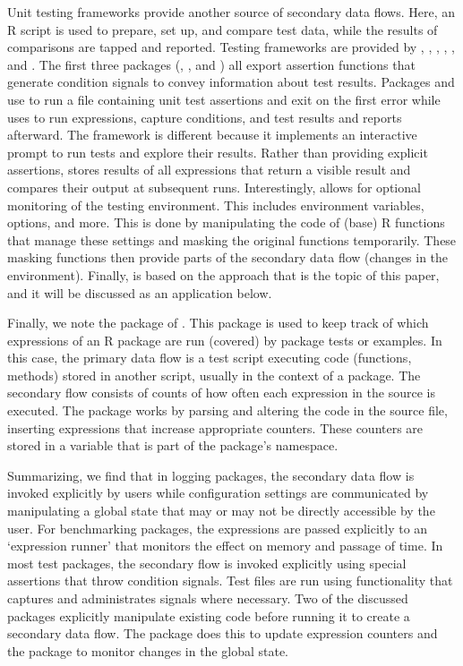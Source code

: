 Unit testing frameworks provide another source of secondary data flows.  Here,
an R script is used to prepare, set up, and compare test data, while the
results of comparisons are tapped and reported. Testing frameworks are provided
by  \citep{wickham2011testthat}, ,
\citep{burger2018runit},  \cite{xie2018testit}, 
\citep{gaslam2019unitizer}, and  \citep{loo2019tinytest}. The
first three packages (, , and ) all export
assertion functions that generate condition signals to convey information about
test results. Packages  and  use  to
run a file containing unit test assertions and exit on the first error while
 uses  to run expressions, capture conditions, and
test results and reports afterward. The  framework is different
because it implements an interactive prompt to run tests and explore their
results. Rather than providing explicit assertions,  stores
results of all expressions that return a visible result and compares their
output at subsequent runs.  Interestingly,  allows for optional
monitoring of the testing environment. This includes environment variables,
options, and more. This is done by manipulating the code of (base) R functions
that manage these settings and masking the original functions temporarily.
These masking functions then provide parts of the secondary data flow (changes
in the environment).  Finally,  is based on the approach that is
the topic of this paper, and it will be discussed as an application below.

Finally, we note the  package of \citet{hester2018covr}. This package
is used to keep track of which expressions of an R package are run (covered) by
package tests or examples. In this case, the primary data flow is a test
script executing code (functions, methods) stored in another script, usually in
the context of a package. The secondary flow consists of counts of how often
each expression in the source is executed. The package works by parsing
and altering the code in the source file, inserting expressions that increase
appropriate counters. These counters are stored in a variable that is part of
the package's namespace.

Summarizing, we find that in logging packages, the secondary data flow is
invoked explicitly by users while configuration settings are communicated by
manipulating a global state that may or may not be directly accessible by the
user. For benchmarking packages, the expressions are passed explicitly to an
`expression runner' that monitors the effect on memory and passage of time.  In
most test packages,  the secondary flow is invoked explicitly using special
assertions that throw condition signals. Test files are run using functionality
that captures and administrates signals where necessary. Two of the discussed
packages explicitly manipulate existing code before running it to create a
secondary data flow. The  package does this to update expression
counters and the  package to monitor changes in the global state.

